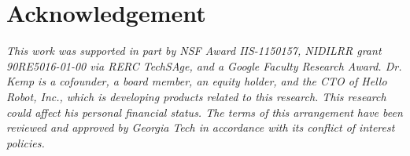 \documentclass[letterpaper, 10 pt, conference]{ieeeconf}
\begin{document}
\section*{Acknowledgement}
\textit{This work was supported in part by NSF Award IIS-1150157, NIDILRR grant 90RE5016-01-00 via RERC TechSAge, and a Google Faculty Research Award. Dr. Kemp is a cofounder, a board member, an equity holder, and the CTO of Hello Robot, Inc., which is developing products related to this research. This research could affect his personal financial status. The terms of this arrangement have been reviewed and approved by Georgia Tech in accordance with its conflict of interest policies.}



\end{document}
